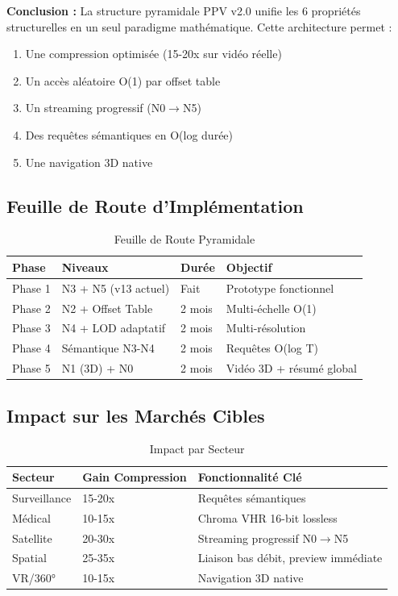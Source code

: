 \documentclass[12pt,a4paper]{article}
\theoremstyle{definition}
\begin{document}
	\begin{thmbox}
		\textbf{Conclusion :} La structure pyramidale PPV v2.0 unifie les 6 propriétés structurelles en un seul paradigme mathématique. Cette architecture permet :
		\begin{enumerate}
			\item Une compression optimisée (15-20x sur vidéo réelle)
			\item Un accès aléatoire O(1) par offset table
			\item Un streaming progressif (N0$\to$N5)
			\item Des requêtes sémantiques en O(log durée)
			\item Une navigation 3D native
		\end{enumerate}
	\end{thmbox}
	
	\subsection{Feuille de Route d'Implémentation}
	
	\begin{table}[h]
		\centering
		\caption{Feuille de Route Pyramidale}
		\label{tab:roadmap_pyramide}
		\begin{tabular}{@{}llll@{}}
			\toprule
			\textbf{Phase} & \textbf{Niveaux} & \textbf{Durée} & \textbf{Objectif} \\ \midrule
			Phase 1 & N3 + N5 (v13 actuel) & Fait & Prototype fonctionnel \\
			Phase 2 & N2 + Offset Table & 2 mois & Multi-échelle O(1) \\
			Phase 3 & N4 + LOD adaptatif & 2 mois & Multi-résolution \\
			Phase 4 & Sémantique N3-N4 & 2 mois & Requêtes O(log T) \\
			Phase 5 & N1 (3D) + N0 & 2 mois & Vidéo 3D + résumé global \\
			\bottomrule
		\end{tabular}
	\end{table}
	
	\subsection{Impact sur les Marchés Cibles}
	
	\begin{table}[h]
		\centering
		\caption{Impact par Secteur}
		\label{tab:impact_secteurs}
		\begin{tabular}{@{}lll@{}}
			\toprule
			\textbf{Secteur} & \textbf{Gain Compression} & \textbf{Fonctionnalité Clé} \\ \midrule
			Surveillance & 15-20x & Requêtes sémantiques \\
			Médical & 10-15x & Chroma VHR 16-bit lossless \\
			Satellite & 20-30x & Streaming progressif N0$\to$N5 \\
			Spatial & 25-35x & Liaison bas débit, preview immédiate \\
			VR/360° & 10-15x & Navigation 3D native \\
			\bottomrule
		\end{tabular}
	\end{table}
	
\end{document}
